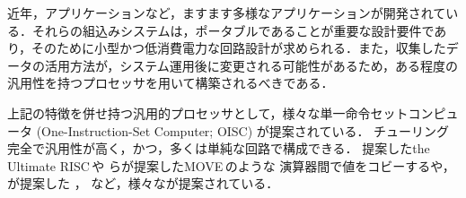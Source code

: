 \documentclass[12pt,landscape,hiragino-pro]{ltjtarticle}
\begin{document}
近年，アプリケーションなど，ますます多様なアプリケーションが開発されている．それらの組込みシステムは，ポータブルであることが重要な設計要件であり，そのために小型かつ低消費電力な回路設計が求められる．また，収集したデータの活用方法が，システム運用後に変更される可能性があるため，ある程度の汎用性を持つプロセッサを用いて構築されるべきである．

上記の特徴を併せ持つ汎用的プロセッサとして，様々な単一命令セットコンピュータ (One-Instruction-Set Computer; OISC) が提案されている．
チューリング完全で汎用性が高く，かつ，多くは単純な回路で構成できる．
提案した\JAspace the Ultimate RISC\,\cite{Jones1988}\AJspace や
らが提案した\JAspace MOVE\,\cite{Corporaal1991,Corporaal1993}\AJspace のような
演算器間で値をコビーするや，%
が提案した%
\cite{Mazonka2009}，
など，様々なが提案されている．
\end{document}
